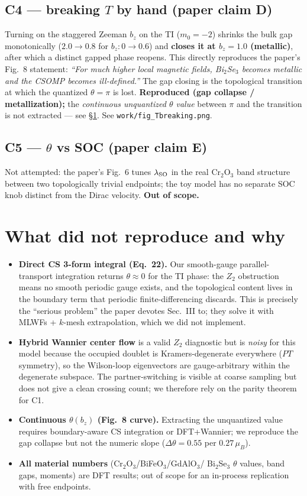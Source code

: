 \documentclass[11pt]{article}
\begin{document}
\subsection*{C4 --- breaking $T$ by hand (paper claim D)}
Turning on the staggered Zeeman $b_z$ on the TI ($m_0=-2$) shrinks the bulk
gap monotonically ($2.0\to0.8$ for $b_z:0\to0.6$) and \textbf{closes it at
$b_z=1.0$ (metallic)}, after which a distinct gapped phase reopens. This
directly reproduces the paper's Fig.~8 statement: \emph{``For much higher
local magnetic fields, Bi$_2$Se$_3$ becomes metallic and the CSOMP becomes
ill-defined.''} The gap closing is the topological transition at which the
quantized $\theta=\pi$ is lost. \textbf{Reproduced (gap collapse /
metallization);} the \emph{continuous unquantized $\theta$ value} between
$\pi$ and the transition is not extracted --- see \S\ref{sec:fail}.
See \texttt{work/fig\_Tbreaking.png}.

\subsection*{C5 --- $\theta$ vs SOC (paper claim E)}
Not attempted: the paper's Fig.~6 tunes $\lambda_{\rm SO}$ in the real
Cr$_2$O$_3$ band structure between two topologically trivial endpoints; the
toy model has no separate SOC knob distinct from the Dirac velocity.
\textbf{Out of scope.}

\section{What did not reproduce and why}\label{sec:fail}
\begin{itemize}
\item \textbf{Direct CS 3-form integral (Eq.~22).} Our smooth-gauge
parallel-transport integration returns $\theta\approx0$ for the TI phase:
the $Z_2$ obstruction means no smooth periodic gauge exists, and the
topological content lives in the boundary term that periodic
finite-differencing discards. This is precisely the ``serious problem''
the paper devotes Sec.~III to; they solve it with MLWFs + $k$-mesh
extrapolation, which we did not implement.
\item \textbf{Hybrid Wannier center flow} is a valid $Z_2$ diagnostic but
is \emph{noisy} for this model because the occupied doublet is
Kramers-degenerate everywhere ($PT$ symmetry), so the Wilson-loop
eigenvectors are gauge-arbitrary within the degenerate subspace. The
partner-switching is visible at coarse sampling but does not give a clean
crossing count; we therefore rely on the parity theorem for C1.
\item \textbf{Continuous $\theta(b_z)$ (Fig.~8 curve).} Extracting the
unquantized value requires boundary-aware CS integration or DFT+Wannier;
we reproduce the gap collapse but not the numeric slope
($\Delta\theta=0.55$ per $0.27\,\mu_B$).
\item \textbf{All material numbers} (Cr$_2$O$_3$/BiFeO$_3$/GdAlO$_3$/
Bi$_2$Se$_3$ $\theta$ values, band gaps, moments) are DFT results;
out of scope for an in-process replication with free endpoints.
\end{itemize}
\end{document}
